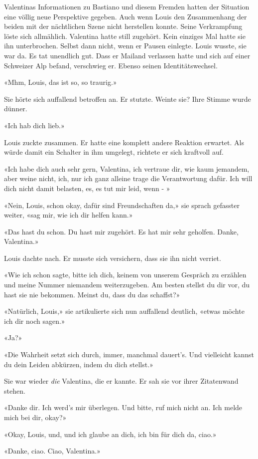 Valentinas Informationen zu Bastiano und diesem Fremden hatten der Situation eine völlig neue
Perspektive gegeben. Auch wenn Louis den Zusammenhang der beiden mit der
nächtlichen Szene nicht herstellen konnte.
Seine Verkrampfung löste sich allmählich. Valentina hatte still zugehört. Kein einziges Mal hatte sie ihn unterbrochen. Selbst dann nicht, wenn er
Pausen einlegte. Louis wusste, sie war da. Es tat unendlich gut.
Dass er Mailand verlassen hatte und sich auf einer Schweizer Alp befand,
verschwieg er. Ebenso seinen Identitätswechsel. 

«Mhm, Louis, das ist so, so traurig.» 

Sie hörte sich auffallend betroffen an. Er stutzte. Weinte sie? Ihre Stimme wurde dünner.

«Ich hab dich lieb.»

Louis zuckte zusammen. Er hatte eine komplett andere Reaktion erwartet.  
Als würde damit ein Schalter in ihm umgelegt, richtete er sich kraftvoll auf.

«Ich habe dich auch sehr gern, Valentina, ich vertraue dir, wie kaum
jemandem, aber weine nicht, ich, nur ich ganz alleine trage die
Verantwortung dafür. Ich will dich nicht damit belasten, es, es tut mir
leid, wenn - »

«Nein, Louis, schon okay, dafür sind Freundschaften da,» sie sprach 
gefasster weiter, «sag mir, wie ich dir helfen kann.»  

«Das hast du schon. Du hast mir zugehört. Es hat mir sehr geholfen.
Danke, Valentina.»

Louis dachte nach. Er musste sich versichern, dass sie ihn nicht
verriet.

«Wie ich schon sagte, bitte ich dich, keinem von unserem Gespräch zu
erzählen und meine Nummer niemandem weiterzugeben. Am besten stellst du
dir vor, du hast sie nie bekommen. Meinst du, dass du das schaffst?»

«Natürlich, Louis,» sie artikulierte sich nun auffallend deutlich,
«etwas möchte ich dir noch sagen.»

«Ja?»

«Die Wahrheit setzt sich durch, immer, manchmal dauert’s. Und vielleicht
kannst du dein Leiden abkürzen, indem du dich stellst.»

Sie war wieder \emph{die} Valentina, die er kannte. Er sah sie vor ihrer
Zitatenwand stehen.

«Danke dir. Ich werd’s mir überlegen. Und bitte, ruf mich nicht an. Ich
melde mich bei dir, okay?»

«Okay, Louis, und, und ich glaube an dich, ich bin für dich da, ciao.»

«Danke, ciao. Ciao, Valentina.»
